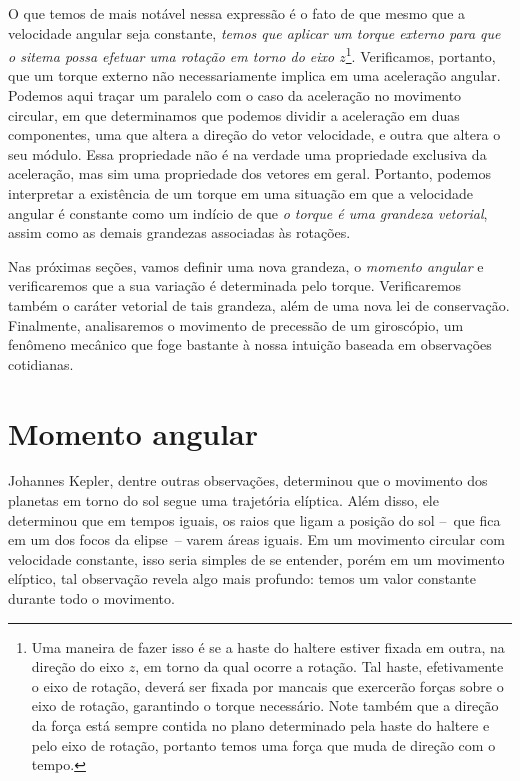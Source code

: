 O que temos de mais notável nessa expressão é o fato de que mesmo que a velocidade angular seja constante, \emph{temos que aplicar um torque externo para que o sitema possa efetuar uma rotação em torno do eixo $z$}\footnote{Uma maneira de fazer isso é se a haste do haltere estiver fixada em outra, na direção do eixo $z$, em torno da qual ocorre a rotação. Tal haste, efetivamente o eixo de rotação, deverá ser fixada por mancais que exercerão forças sobre o eixo de rotação, garantindo o torque necessário. Note também que a direção da força está sempre contida no plano determinado pela haste do haltere e pelo eixo de rotação, portanto temos uma força que muda de direção com o tempo.}. Verificamos, portanto, que um torque externo não necessariamente implica em uma aceleração angular. Podemos aqui traçar um paralelo com o caso da aceleração no movimento circular, em que determinamos que podemos dividir a aceleração em duas componentes, uma que altera a direção do vetor velocidade, e outra que altera o seu módulo. Essa propriedade não é na verdade uma propriedade exclusiva da aceleração, mas sim uma propriedade dos vetores em geral. Portanto, podemos interpretar a existência de um torque em uma situação em que a velocidade angular é constante como um indício de que \emph{o torque é uma grandeza vetorial}, assim como as demais grandezas associadas às rotações.

Nas próximas seções, vamos definir uma nova grandeza, o \emph{momento angular} e verificaremos que a sua variação é determinada pelo torque. Verificaremos também o caráter vetorial de tais grandeza, além de uma nova lei de conservação. Finalmente, analisaremos o movimento de precessão de um giroscópio, um fenômeno mecânico que foge bastante à nossa intuição baseada em observações cotidianas.

\section{Momento angular}

Johannes Kepler, dentre outras observações, determinou que o movimento dos planetas em torno do sol segue uma trajetória elíptica. Além disso, ele determinou que em tempos iguais, os raios que ligam a posição do sol --~que fica em um dos focos da elipse~-- varem áreas iguais. Em um movimento circular com velocidade constante, isso seria simples de se entender, porém em um movimento elíptico, tal observação revela algo mais profundo: temos um valor constante durante todo o movimento.

